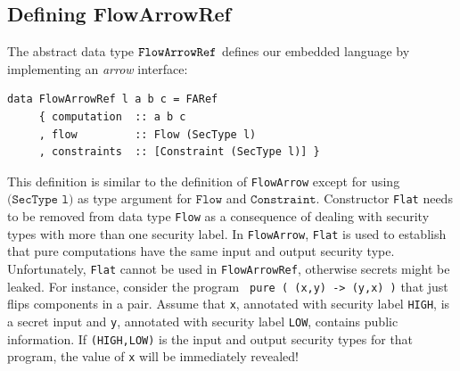 \documentclass[times, 10pt,twocolumn]{article}
\begin{document}
\subsection{Defining FlowArrowRef} \label{sec:flowarrowref}
The abstract data type $\mathtt{FlowArrowRef}$ defines our embedded
language by implementing an {\em arrow} interface:
%
\begin{Verbatim}[fontsize=\footnotesize]
data FlowArrowRef l a b c = FARef
     { computation  :: a b c
     , flow         :: Flow (SecType l)
     , constraints  :: [Constraint (SecType l)] }
\end{Verbatim}
This definition is similar to the definition of 
\texttt{FlowArrow} except for using $\texttt{(SecType l)}$
as type argument for $\texttt{Flow}$ and $\texttt{Constraint}$.
%
Constructor \texttt{Flat}  needs to be removed
from data type \texttt{Flow} as a consequence of dealing with security types 
with more than one security label. 
In \texttt{FlowArrow}, \texttt{Flat} 
is used to establish that pure computations have
the same input and output security type. Unfortunately, \texttt{Flat}
cannot be used in \texttt{FlowArrowRef}, otherwise secrets might be
leaked. 
For instance, consider the program 
\texttt{ pure (\ (x,y) -> (y,x) )} that just  flips 
components in a pair. Assume that \texttt{x}, annotated 
with security label \texttt{HIGH}, is a secret input and \texttt{y}, 
annotated with security label \texttt{LOW}, contains public
information. If \texttt{(HIGH,LOW)} is the input and output
security types for that program, the value of 
\texttt{x} will be immediately revealed! 
\end{document}
